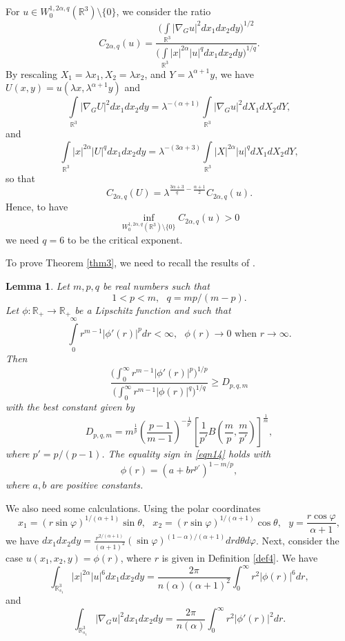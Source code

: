 \documentclass[10pt, reqno]{amsart}
\newtheorem{lemma}{Lemma}
\begin{document}
	For $u \in W_0^{1,2\alpha,q} (\mathbb{R}^3)\setminus \{0\}$, we consider the ratio
	\begin{equation}\label{eqn13}
		C_{2\alpha,q}(u) = \dfrac{\Bigg(\int\limits_{\mathbb{R}^3}|\nabla_G u|^2 dx_1dx_2dy\Bigg)^{1/2}}{\Bigg(\int\limits_{\mathbb{R}^3} |x|^{2\alpha}|u|^q dx_1dx_2dy \Bigg)^{1/q}}.
	\end{equation}
	By rescaling $X_1= \lambda x_1, X_2 = \lambda x_2$, and $Y = \lambda^{\alpha+1} y$, we have $U(x,y) = u(\lambda x, \lambda^{\alpha+1} y)$ and
	$$ \int\limits_{\mathbb{R}^3} |\nabla_G U|^2 dx_1dx_2dy = \lambda^{-(\alpha+1)}\int\limits_{\mathbb{R}^3} |\nabla_G u|^2 dX_1dX_2dY,$$
	and
	$$ \int\limits_{\mathbb{R}^3} |x|^{2\alpha}|U|^q dx_1dx_2dy = \lambda^{-(3\alpha+3)}\int\limits_{\mathbb{R}^3} |X|^{2\alpha} |u|^q dX_1dX_2dY,$$
	so that 
	$$ C_{2\alpha,q} (U) = \lambda^{\frac{3\alpha+3}{q} -\frac{\alpha+1}{2}} C_{2\alpha,q} (u).$$
	Hence, to have 
	$$ \inf\limits_{W_0^{1,2\alpha,q}(\mathbb{R}^3) \setminus \{0\} } C_{2\alpha,q} (u) > 0$$
	we need $q = 6$ to be the critical exponent.
	
	To prove Theorem \ref{thm3}, we need to recall the results of \cite[Lemma 2]{Tal}.
	\begin{lemma}\label{lem2}
		Let $m, p, q$ be real numbers such that
		$$1< p < m, \textrm{ } q = mp/(m-p).$$
		Let $\phi : \mathbb{R}_+ \to \mathbb{R}_+$ be a Lipschitz function and such that
		\begin{equation*}
			\int\limits_0^\infty r^{m-1} |\phi'(r)|^p dr < \infty, \textrm{ } \phi(r) \to 0 \textrm{ when } r \to \infty.
		\end{equation*}
		Then
		\begin{equation}\label{eqn14} \dfrac{\big(\int_0^\infty r^{m-1} |\phi'(r)|^p\big)^{1/p}}{\big(\int_0^\infty r^{m-1} |\phi(r)|^q\big)^{1/q}} \geq D_{p,q,m}\end{equation}
		with the best constant given by
		$$D_{p,q,m} = m^{\frac{1}{p}}\left(\dfrac{p-1}{m-1}\right)^{-\frac{1}{p'}} \left[ \dfrac{1}{p'} B\left( \dfrac{m}{p}, \dfrac{m}{p'} \right)\right]^{\frac{1}{m}},$$
		where $p' = p/(p-1)$. The equality sign in \eqref{eqn14} holds with
		$$ \phi (r) = (a + br^{p'})^{1-m/p},$$
		where $a, b$ are positive constants.
	\end{lemma}
	
	We also need some calculations. Using the polar coordinates
	$$x_1 = (r\sin\varphi)^{1/(\alpha+1)}\sin\theta, \textrm{ } x_2 = (r\sin\varphi)^{1/(\alpha+1)}\cos\theta, \textrm{ } y = \dfrac{r\cos \varphi}{\alpha+1},$$
	we have $dx_1dx_2dy = \frac{r^{2/(\alpha+1)}}{(\alpha+1)^2}(\sin \varphi)^{(1-\alpha)/(\alpha+1)}drd\theta d\varphi$. Next, consider the case $u(x_1,x_2,y) = \phi(r)$, where $r$ is given in Definition \ref{def4}. We have
	\begin{equation}\label{eqn15}
		\int_{\mathbb{R}^3_{s_1}} |x|^{2\alpha} |u|^{6}dx_1dx_2dy = \dfrac{2\pi}{n(\alpha)(\alpha+1)^2}  \int_0^\infty r^2|\phi(r)|^{6}dr,
	\end{equation}
	and
	\begin{equation}\label{eqn16}
		\int_{\mathbb{R}^3_{s_1}} |\nabla_G u|^2 dx_1dx_2dy =  \dfrac{2\pi}{n(\alpha)} \int_0^\infty r^2|\phi'(r)|^2dr.
	\end{equation}
	
\end{document}
